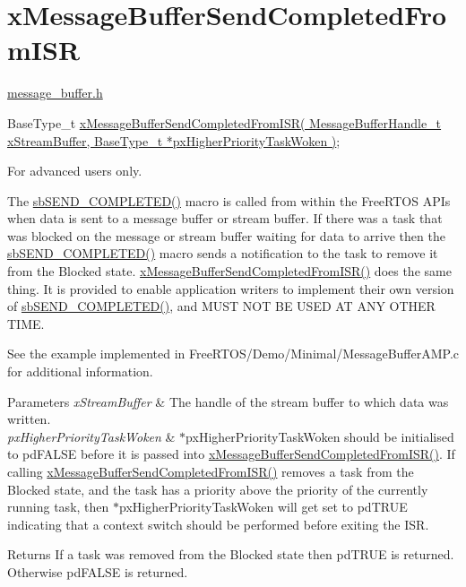 \hypertarget{group__x_message_buffer_send_completed_from_i_s_r}{}\section{x\+Message\+Buffer\+Send\+Completed\+From\+I\+SR}
\label{group__x_message_buffer_send_completed_from_i_s_r}
\hyperlink{message__buffer_8h}{message\+\_\+buffer.\+h}


\begin{DoxyPre}
BaseType\_t \hyperlink{message__buffer_8h_a45918d12bf530cb2b4bf21c0936460a9}{xMessageBufferSendCompletedFromISR( MessageBufferHandle\_t xStreamBuffer, BaseType\_t *pxHigherPriorityTaskWoken )};
\end{DoxyPre}


For advanced users only.

The \hyperlink{stream__buffer_8c_aa75273dfbcd92710254df0165ae1da5d}{sb\+S\+E\+N\+D\+\_\+\+C\+O\+M\+P\+L\+E\+T\+E\+D()} macro is called from within the Free\+R\+T\+OS A\+P\+Is when data is sent to a message buffer or stream buffer. If there was a task that was blocked on the message or stream buffer waiting for data to arrive then the \hyperlink{stream__buffer_8c_aa75273dfbcd92710254df0165ae1da5d}{sb\+S\+E\+N\+D\+\_\+\+C\+O\+M\+P\+L\+E\+T\+E\+D()} macro sends a notification to the task to remove it from the Blocked state. \hyperlink{message__buffer_8h_a45918d12bf530cb2b4bf21c0936460a9}{x\+Message\+Buffer\+Send\+Completed\+From\+I\+S\+R()} does the same thing. It is provided to enable application writers to implement their own version of \hyperlink{stream__buffer_8c_aa75273dfbcd92710254df0165ae1da5d}{sb\+S\+E\+N\+D\+\_\+\+C\+O\+M\+P\+L\+E\+T\+E\+D()}, and M\+U\+ST N\+OT BE U\+S\+ED AT A\+NY O\+T\+H\+ER T\+I\+ME.

See the example implemented in Free\+R\+T\+O\+S/\+Demo/\+Minimal/\+Message\+Buffer\+A\+M\+P.\+c for additional information.


\begin{DoxyParams}{Parameters}
{\em x\+Stream\+Buffer} & The handle of the stream buffer to which data was written.\\
\hline
{\em px\+Higher\+Priority\+Task\+Woken} & $\ast$px\+Higher\+Priority\+Task\+Woken should be initialised to pd\+F\+A\+L\+SE before it is passed into \hyperlink{message__buffer_8h_a45918d12bf530cb2b4bf21c0936460a9}{x\+Message\+Buffer\+Send\+Completed\+From\+I\+S\+R()}. If calling \hyperlink{message__buffer_8h_a45918d12bf530cb2b4bf21c0936460a9}{x\+Message\+Buffer\+Send\+Completed\+From\+I\+S\+R()} removes a task from the Blocked state, and the task has a priority above the priority of the currently running task, then $\ast$px\+Higher\+Priority\+Task\+Woken will get set to pd\+T\+R\+UE indicating that a context switch should be performed before exiting the I\+SR.\\
\hline
\end{DoxyParams}
\begin{DoxyReturn}{Returns}
If a task was removed from the Blocked state then pd\+T\+R\+UE is returned. Otherwise pd\+F\+A\+L\+SE is returned. 
\end{DoxyReturn}
